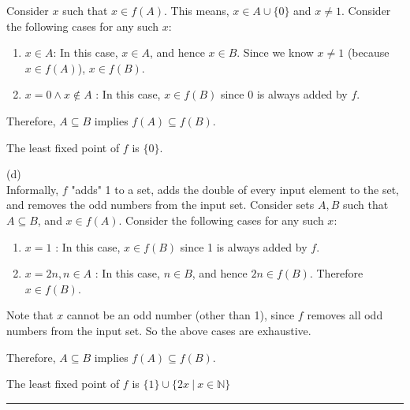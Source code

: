 \documentclass[12pt,letterpaper, onecolumn]{exam}
\begin{document}
\begin{questions}
	Consider $x$ such that $x \in f(A)$. This means, $x \in A \cup \{0\}$ and $x \neq 1$.
	Consider the following cases for any such $x$:
	\begin{enumerate}
		\item $x \in A $: In this case, $x \in A$, and hence $x \in B$. Since we know $x \neq 1$ (because $x \in f(A)$), $x \in f(B)$.
		\item $x = 0 \land x \notin A$ : In this case, $x \in f(B)$ since 0 is always added by $f$.
	\end{enumerate}

	Therefore, $A \subseteq B$ implies $f(A) \subseteq f(B)$.

	The least fixed point of $f$ is $ \{0\} $. 

	(d) \\

	Informally, $f$ "adds" 1 to a set, adds the double of every input element to the set, and removes the odd numbers from the input set.
	Consider sets $A, B$ such that $A \subseteq B$, and $x \in f(A)$.
	Consider the following cases for any such $x$:
	\begin{enumerate}
		\item $x = 1$ : In this case, $x \in f(B)$ since 1 is always added by $f$.
		\item $x = 2n, n \in A$ : In this case, $n \in B$, and hence $2n \in f(B)$. Therefore $x \in f(B)$.
	\end{enumerate}
	Note that $x$ cannot be an odd number (other than 1), since $f$ removes all odd numbers from the input set.
	So the above cases are exhaustive.

	Therefore, $A \subseteq B$ implies $f(A) \subseteq f(B)$.

	The least fixed point of $f$ is $\{1\} \cup \{2x \: | \: x \in \mathbb{N}\}$


    {\rule{17cm}{0.4pt}}


\end{questions}
\end{document}
